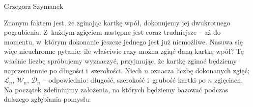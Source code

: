 \def\numprint#1.{#1{,}}
\def\stackon#1#2{\begin{array}{@{}c@{}}#2\\[-2pt]#1
                 \end{array}}
                 
{Grzegorz Szymanek} 
                 
	
	

	Znanym faktem jest, że zginając kartkę wpół, dokonujemy jej dwukrotnego pogrubienia.
	Z~każdym zgięciem następne jest coraz trudniejsze -- aż do 
	momentu, w~którym dokonanie jeszcze jednego jest już niemożliwe. 
	Nasuwa się więc nieuchronne pytanie: ile właściwie razy można zgiąć daną kartkę wpół?
	Tę właśnie liczbę spróbujemy wyznaczyć, przyjmując, że kartkę zginać będziemy naprzemiennie
	po długości i~szerokości.
	Niech $n$ oznacza liczbę dokonanych zgięć; $\mathcal{L}_n$, $\mathcal{W}_n$, $\mathcal{D}_n$ -- 
	odpowiednio: długość, szerokość i~grubość kartki po $n$ zgięciach. 
	Na początek zdefiniujmy założenia, na których będziemy bazować 
	podczas dalszego zgłębiania pomysłu:	
